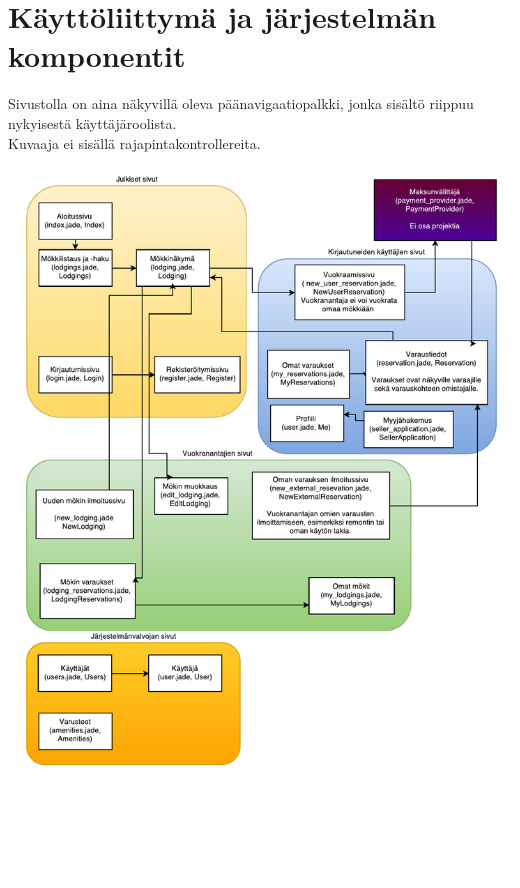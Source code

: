 \chapter{Käyttöliittymä ja järjestelmän komponentit}


Sivustolla on aina näkyvillä oleva päänavigaatiopalkki, jonka sisältö riippuu nykyisestä käyttäjäroolista.\\
Kuvaaja ei sisällä rajapintakontrollereita.\\
\newpage

\includegraphics[width = 14cm]{./diagrams/view_architecture.pdf}
